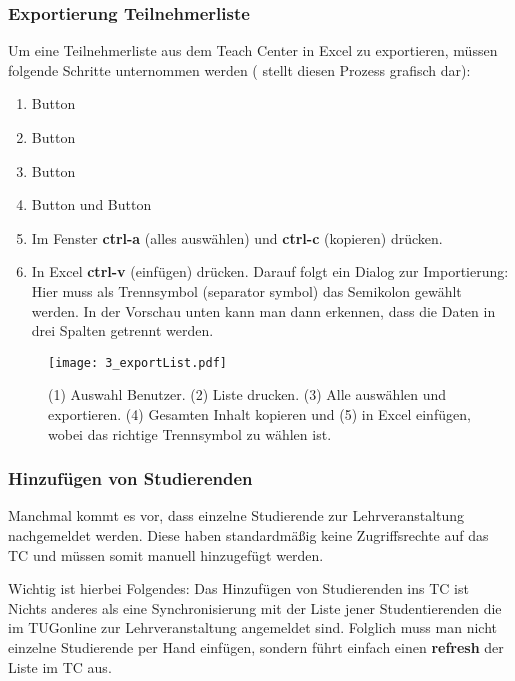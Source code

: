 \subsubsection{Exportierung Teilnehmerliste}

Um eine Teilnehmerliste aus dem Teach Center in Excel zu exportieren, müssen
folgende Schritte unternommen werden ( stellt diesen
Prozess grafisch dar):

\begin{enumerate}
\item Button 
\item Button 
\item Button 
\item Button  und Button 
\item Im Fenster {\bf ctrl-a} (alles auswählen) und {\bf ctrl-c} (kopieren)
  drücken.
\item In Excel {\bf ctrl-v} (einfügen) drücken. Darauf folgt ein Dialog zur
  Importierung: Hier muss als Trennsymbol (\glqq{}separator symbol\grqq{})
  das Semikolon gewählt werden. In der Vorschau unten kann man dann erkennen,
  dass die Daten in drei Spalten getrennt werden.
\end{enumerate}

\begin{figure}[htbp]
  \texttt{[image: 3\_exportList.pdf]}
  \caption{ (1) Auswahl Benutzer. (2) Liste drucken. (3) Alle ausw\"{a}hlen und
    exportieren. (4) Gesamten Inhalt kopieren und (5) in Excel einf\"{u}gen,
    wobei das richtige Trennsymbol zu w\"{a}hlen ist.}
  \label{fig:export}
\end{figure}

\subsubsection{Hinzufügen von Studierenden}

Manchmal kommt es vor, dass einzelne Studierende zur Lehrveranstaltung
nachgemeldet werden. Diese haben standardmäßig keine Zugriffsrechte auf das
TC und müssen somit manuell hinzugefügt werden.

Wichtig ist hierbei Folgendes: Das 
\glqq{}Hinzufügen von Studierenden ins TC\grqq{} ist Nichts anderes als eine 
Synchronisierung mit der Liste jener Studentierenden die im TUGonline zur 
Lehrveranstaltung angemeldet sind. Folglich muss man nicht einzelne Studierende
per Hand einfügen, sondern führt einfach einen {\bf refresh} der Liste im TC 
aus.

